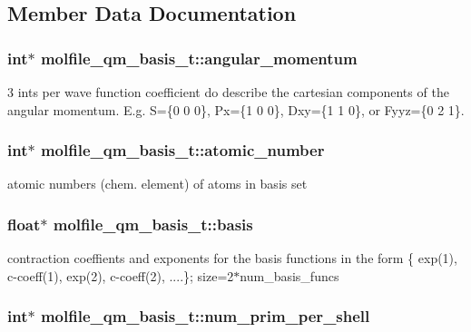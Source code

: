 \subsection{\-Member \-Data \-Documentation}
\hypertarget{structmolfile__qm__basis__t_a12499d655a4c7b038bab7d14619857cc}{
\subsubsection[{angular\-\_\-momentum}]{\setlength{\rightskip}{0pt plus 5cm}int$\ast$ {\bf molfile\-\_\-qm\-\_\-basis\-\_\-t\-::angular\-\_\-momentum}}}\label{structmolfile__qm__basis__t_a12499d655a4c7b038bab7d14619857cc}
3 ints per wave function coefficient do describe the cartesian components of the angular momentum. \-E.\-g. \-S=\{0 0 0\}, \-Px=\{1 0 0\}, \-Dxy=\{1 1 0\}, or \-Fyyz=\{0 2 1\}. \hypertarget{structmolfile__qm__basis__t_a46638dd77f5549b96dbd0818a2116f4b}{
\subsubsection[{atomic\-\_\-number}]{\setlength{\rightskip}{0pt plus 5cm}int$\ast$ {\bf molfile\-\_\-qm\-\_\-basis\-\_\-t\-::atomic\-\_\-number}}}\label{structmolfile__qm__basis__t_a46638dd77f5549b96dbd0818a2116f4b}
atomic numbers (chem. element) of atoms in basis set \hypertarget{structmolfile__qm__basis__t_a8d635f5a6ef7db7de77dc057d00a3f31}{
\subsubsection[{basis}]{\setlength{\rightskip}{0pt plus 5cm}float$\ast$ {\bf molfile\-\_\-qm\-\_\-basis\-\_\-t\-::basis}}}\label{structmolfile__qm__basis__t_a8d635f5a6ef7db7de77dc057d00a3f31}
contraction coeffients and exponents for the basis functions in the form \{ exp(1), c-\/coeff(1), exp(2), c-\/coeff(2), ....\}; size=2$\ast$num\-\_\-basis\-\_\-funcs \hypertarget{structmolfile__qm__basis__t_a7e3de0b8804af1da9133607da286dd1d}{
\subsubsection[{num\-\_\-prim\-\_\-per\-\_\-shell}]{\setlength{\rightskip}{0pt plus 5cm}int$\ast$ {\bf molfile\-\_\-qm\-\_\-basis\-\_\-t\-::num\-\_\-prim\-\_\-per\-\_\-shell}}}\label{structmolfile__qm__basis__t_a7e3de0b8804af1da9133607da286dd1d}
